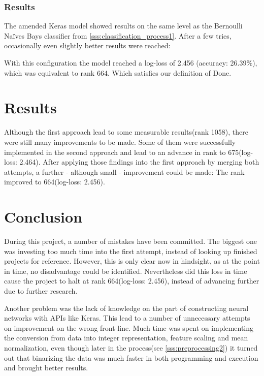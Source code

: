 \documentclass[12pt,a4paper]{scrartcl}
\begin{document}
\subsubsection{Results}\label{sss:results3}
The amended Keras model showed results on the same level as the Bernoulli Naïves Bays classifier from \ref{sss:classification_process1}. After a few tries, occasionally even slightly better results were reached:



With this configuration the model reached a log-loss of 2.456 (accuracy: 26.39\%), which was equivalent to rank 664. Which satisfies our definition of Done.

\pagebreak
\section{Results}\label{s:results}
Although the first approach lead to some measurable results(rank 1058), there were still many improvements to be made. Some of them were successfully implemented in the second approach and lead to an advance in rank to 675(log-loss: 2.464). After applying those findings into the first approach by merging both attempts, a further - although small - improvement could be made: The rank improved to 664(log-loss: 2.456).
\pagebreak

\section{Conclusion}\label{s:conclusion}
During this project, a number of mistakes have been committed. The biggest one was investing too much time into the first attempt, instead of looking up finished projects for reference. However, this is only clear now in hindsight, as at the point in time, no disadvantage could be identified. Nevertheless did this loss in time cause the project to halt at rank 664(log-loss: 2.456), instead of advancing further due to further research.

Another problem was the lack of knowledge on the part of constructing neural networks with APIs like Keras. This lead to a number of unnecessary attempts on improvement on the wrong front-line. Much time was spent on implementing the conversion from data into integer representation, feature scaling and mean normalization, even though later in the process(see \ref{sss:preprocessing2}) it turned out that binarizing the data was much faster in both programming and execution and brought better results.
\end{document}
